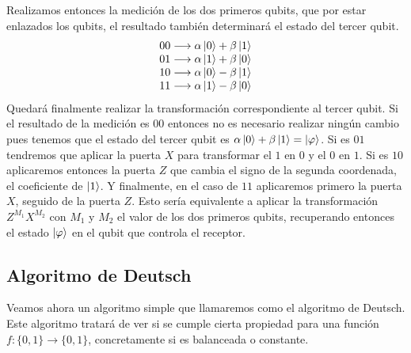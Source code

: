 \documentclass[a4paper]{article}
\numberwithin{equation}{section}
\begin{document}
Realizamos entonces la medición de los dos primeros qubits, que por estar enlazados los qubits, el resultado también determinará el estado del tercer qubit.
\begin{equation}
\begin{array}{l}
00 \longrightarrow \alpha\ket{0}+\beta\ket{1} \\
01 \longrightarrow \alpha\ket{1}+\beta\ket{0} \\
10 \longrightarrow \alpha\ket{0}-\beta\ket{1} \\
11 \longrightarrow \alpha\ket{1}-\beta\ket{0}
\end{array}
\end{equation}
Quedará finalmente realizar la transformación correspondiente al tercer qubit. Si el resultado de la medición es $00$ entonces no es necesario realizar ningún cambio pues tenemos que el estado del tercer qubit es $\alpha\ket{0}+\beta\ket{1} = \ket{\varphi}$. Si es $01$ tendremos que aplicar la puerta $X$ para transformar el $1$ en $0$ y el $0$ en $1$. Si es $10$ aplicaremos entonces la puerta $Z$ que cambia el signo de la segunda coordenada, el coeficiente de $\ket{1}$. Y finalmente, en el caso de $11$ aplicaremos primero la puerta $X$, seguido de la puerta $Z$.
Esto sería equivalente a aplicar la transformación $Z^{M_1} X^{M_2}$ con $M_1$ y $M_2$ el valor de los dos primeros qubits, recuperando entonces el estado $\ket{\varphi}$ en el qubit que controla el receptor.\\



\subsection{Algoritmo de Deutsch}

Veamos ahora un algoritmo simple que llamaremos como el algoritmo de Deutsch. Este algoritmo tratará de ver si se cumple cierta propiedad para una función $f:\{0, 1\} \rightarrow \{0, 1\}$, concretamente si es balanceada o constante.
\end{document}
